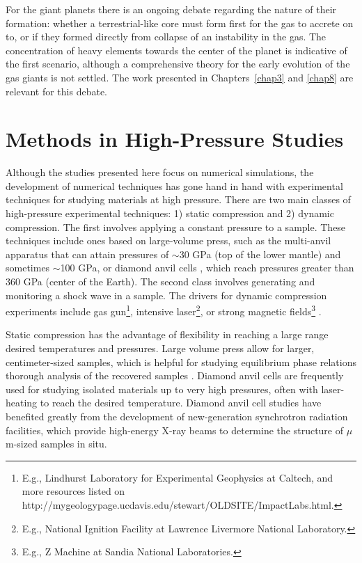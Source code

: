 For the giant planets there is an ongoing debate regarding the nature of their 
formation: whether a terrestrial-like core must form first for the gas to accrete 
on to, or if they formed directly from collapse of an instability in the gas. 
The concentration of heavy elements towards the center of the planet is 
indicative of the first scenario, although a comprehensive theory for the 
early evolution of the gas giants is not settled. The work presented in 
Chapters~\ref{chap3} and \ref{chap8} are relevant for this debate.

\section{Methods in High-Pressure Studies}

Although the studies presented here focus on numerical simulations, the
development of numerical techniques has gone hand in hand with experimental
techniques  for studying materials at high pressure.  There are two main
classes of high-pressure experimental techniques: 1) static compression and 2)
dynamic compression. The first involves applying a constant pressure to a
sample. These techniques include ones based on large-volume press, such as the
multi-anvil apparatus \cite{Ito2007} that can attain pressures of $\sim$30 GPa
(top of the lower mantle) and sometimes $\sim$100 GPa, or diamond anvil cells
\cite{Mao2007}, which reach pressures greater than 360 GPa (center of the
Earth). The second class involves generating and monitoring a shock wave in a
sample. The drivers for dynamic compression experiments include gas
gun\footnote{E.g., Lindhurst Laboratory for Experimental Geophysics at Caltech,
    and more resources listed on
http://mygeologypage.ucdavis.edu/stewart/OLDSITE/ImpactLabs.html.}, intensive
laser\footnote{E.g., National Ignition Facility at Lawrence Livermore National
Laboratory.}, or strong magnetic fields\footnote{E.g., Z Machine at  Sandia
National Laboratories.} \cite{Asimow2015}.

Static compression has the advantage of flexibility in reaching a large range
desired temperatures and pressures. Large volume press allow for larger,
centimeter-sized samples, which is helpful for studying equilibrium phase
relations thorough analysis of the recovered samples . Diamond anvil cells are
frequently used for studying isolated materials up to very high pressures,
often with laser-heating to reach the desired temperature. Diamond anvil cell
studies  have benefited greatly from the development of new-generation
synchrotron radiation facilities, which provide high-energy X-ray beams to
determine the structure of $\mu$m-sized samples in situ.

